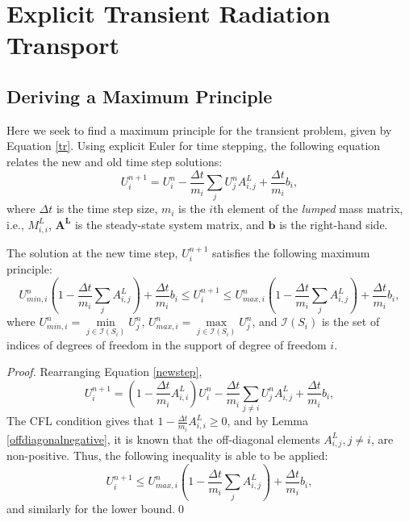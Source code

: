 \section{Explicit Transient Radiation Transport}
\subsection{Deriving a Maximum Principle}
Here we seek to find a maximum principle for the transient problem, given by
Equation \ref{tr}.
Using explicit Euler for time stepping, the following equation relates the new and old
time step solutions:
\begin{equation}\label{newstep}
   U_i^{n+1} = U_i^n - \frac{\Delta t}{m_i}\sum\limits_j U_j^n A^L_{i,j}
      + \frac{\Delta t}{m_i}b_i,
\end{equation}
where $\Delta t$ is the time step size, $m_i$ is the $i$th element of the \emph{lumped} mass
matrix, i.e., $M^L_{i,i}$, $\mathbf{A^L}$ is the steady-state system matrix, and
$\mathbf{b}$ is the right-hand side.

\begin{theorem}
The solution at the new time step, $U^{n+1}_i$ satisfies the following maximum principle:
\begin{equation}\label{explicit_max_principle}
   U_{min,i}^n\left(1-\frac{\Delta t}{m_i}\sum\limits_j A^L_{i,j}\right)
      + \frac{\Delta t}{m_i}b_i
   \le U_i^{n+1} \le
   U_{max,i}^n\left(1-\frac{\Delta t}{m_i}\sum\limits_j A^L_{i,j}\right)
      + \frac{\Delta t}{m_i}b_i,
\end{equation}
where $U_{min,i}^n = \min\limits_{j\in \mathcal{I}(S_i)}U_j^n$,
$U_{max,i}^n = \max\limits_{j\in \mathcal{I}(S_i)}U_j^n$,
and $\mathcal{I}(S_i)$ is the set of indices of degrees of freedom in the
support of degree of freedom $i$.
\end{theorem}
\begin{proof}
Rearranging Equation \ref{newstep},
\[
   U_i^{n+1} = \left(1-\frac{\Delta t}{m_i}A^L_{i,i}\right)U_i^n - \frac{\Delta t}{m_i}
      \sum\limits_{j\ne i} U_j^n A^L_{i,j} + \frac{\Delta t}{m_i}b_i,
\]
The CFL condition gives that $1-\frac{\Delta t}{m_i}A^L_{i,i} \ge 0$, and by
Lemma \ref{offdiagonalnegative}, it is known that the off-diagonal
elements $A^L_{i,j}, j\ne i$, are non-positive. Thus, the following inequality is
able to be applied:
\[
   U_i^{n+1} \le
   U_{max,i}^n\left(1-\frac{\Delta t}{m_i}\sum\limits_j A^L_{i,j}\right)
      + \frac{\Delta t}{m_i}b_i,
\]
and similarly for the lower bound.\qed
\end{proof}